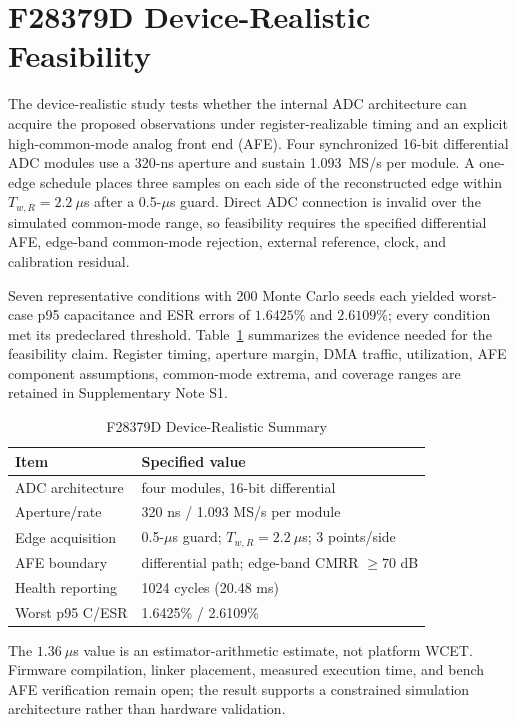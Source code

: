 \section{F28379D Device-Realistic Feasibility}
\label{sec:device}

The device-realistic study tests whether the internal ADC architecture can acquire the proposed observations under register-realizable timing and an explicit high-common-mode analog front end (AFE). Four synchronized 16-bit differential ADC modules use a 320-ns aperture and sustain 1.093~MS/s per module. A one-edge schedule places three samples on each side of the reconstructed edge within $T_{w,R}=2.2~\mu$s after a 0.5-$\mu$s guard. Direct ADC connection is invalid over the simulated common-mode range, so feasibility requires the specified differential AFE, edge-band common-mode rejection, external reference, clock, and calibration residual.

Seven representative conditions with 200 Monte Carlo seeds each yielded worst-case p95 capacitance and ESR errors of $1.6425\%$ and $2.6109\%$; every condition met its predeclared threshold. Table~\ref{tab:f28379d} summarizes the evidence needed for the feasibility claim. Register timing, aperture margin, DMA traffic, utilization, AFE component assumptions, common-mode extrema, and coverage ranges are retained in Supplementary Note S1.

\begin{table}[t]
\caption{F28379D Device-Realistic Summary}
\label{tab:f28379d}
\centering
\footnotesize
\begin{tabular}{ll}
\toprule
Item & Specified value \\
\midrule
ADC architecture & four modules, 16-bit differential \\
Aperture/rate & 320 ns / 1.093 MS/s per module \\
Edge acquisition & 0.5-$\mu$s guard; $T_{w,R}=2.2~\mu$s; 3 points/side \\
AFE boundary & differential path; edge-band CMRR $\ge70$ dB \\
Health reporting & 1024 cycles (20.48 ms) \\
Worst p95 C/ESR & 1.6425\% / 2.6109\% \\
\bottomrule
\end{tabular}
\end{table}

The $1.36~\mu$s \TSRLS{} value is an estimator-arithmetic estimate, not platform WCET. Firmware compilation, linker placement, measured execution time, and bench AFE verification remain open; the result supports a constrained simulation architecture rather than hardware validation.

